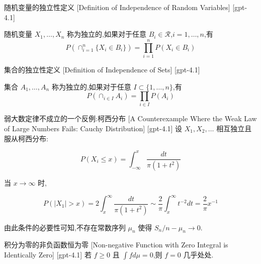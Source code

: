\documentclass[UTF8]{ctexart}
\begin{document}
    
    
    \begin{dfn}
        {随机变量的独立性定义}
        [Definition of Independence of Random Variables]
        [gpt-4.1]
        
随机变量 $X_1, \ldots, X_n$ 称为独立的,如果对于任意 $B_i \in \mathcal{R}$,$i = 1, \ldots, n$,有
\[
P\left(\cap_{i=1}^n \{ X_i \in B_i \}\right) = \prod_{i=1}^n P(X_i \in B_i)
\]

    \end{dfn}
    
    
    
    \begin{dfn}
        {集合的独立性定义}
        [Definition of Independence of Sets]
        [gpt-4.1]
        
集合 $A_1, \ldots, A_n$ 称为独立的,如果对于任意 $I \subset \{ 1, \ldots, n \}$,有
\[
P\left(\cap_{i \in I} A_i\right) = \prod_{i \in I} P(A_i)
\]

    \end{dfn}
    
    
    
    \begin{xmp}
        {弱大数定律不成立的一个反例:柯西分布}
        [A Counterexample Where the Weak Law of Large Numbers Fails: Cauchy Distribution]
        [gpt-4.1]
        设 $X_{1}, X_{2}, \dots$ 相互独立且服从柯西分布:

\[
P(X_{i} \leq x) = \int_{-\infty}^{x} \frac{dt}{\pi (1 + t^{2})}
\]

当 $x \to \infty$ 时,

\[
P(|X_{1}| > x) = 2 \int_{x}^{\infty} \frac{dt}{\pi (1 + t^{2})} \sim \frac{2}{\pi} \int_{x}^{\infty} t^{-2} dt = \frac{2}{\pi} x^{-1}
\]

由此条件的必要性可知,不存在常数序列 $\mu_{n}$ 使得 $S_{n}/n - \mu_{n} \to 0$.

    \end{xmp}
    
    
    
    \begin{thm}
        {积分为零的非负函数恒为零}
        [Non-negative Function with Zero Integral is Identically Zero]
        [gpt-4.1]
        若 $f \geq 0$ 且 $\int f d\mu = 0$,则 $f = 0$ 几乎处处.
    \end{thm}
    
\end{document}
